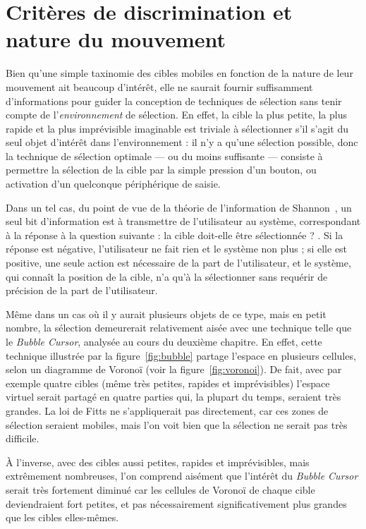 	\section{Critères de discrimination et nature du mouvement}
	Bien qu'une \og simple \fg{} taxinomie des cibles mobiles en fonction de la nature de leur mouvement ait beaucoup d'intérêt, elle ne saurait fournir suffisamment d'informations pour guider la conception de techniques de sélection sans tenir compte de l'\emph{environnement} de sélection. En effet, la cible la plus petite, la plus rapide et la plus imprévisible imaginable est triviale à sélectionner s'il s'agit du seul objet d'intérêt dans l'environnement : il n'y a qu'une sélection possible, donc la technique de sélection optimale --- ou du moins suffisante --- consiste à permettre la sélection de la cible par la simple pression d'un bouton, ou activation d'un quelconque périphérique de saisie.
	
	Dans un tel cas, du point de vue de la théorie de l'information de Shannon~\cite{shannon2001mathematical}, un seul bit d'information est à transmettre de l'utilisateur au système, correspondant à la réponse à la question suivante : \og la cible doit-elle être sélectionnée ? \fg{}. Si la réponse est négative, l'utilisateur ne fait rien et le système non plus ; si elle est positive, une seule action est nécessaire de la part de l'utilisateur, et le système, qui connaît la position de la cible, n'a qu'à la sélectionner sans requérir de précision de la part de l'utilisateur.
	
	Même dans un cas où il y aurait plusieurs objets de ce type, mais en petit nombre, la sélection demeurerait relativement aisée avec une technique telle que le \emph{Bubble Cursor}, analysée au cours du deuxième chapitre. En effet, cette technique illustrée par la figure~\ref{fig:bubble} partage l'espace en plusieurs cellules, selon un diagramme de Voronoï (voir la figure~\ref{fig:voronoi}). De fait, avec par exemple quatre cibles (même très petites, rapides et imprévisibles) l'espace virtuel serait partagé en quatre parties qui, la plupart du temps, seraient très grandes. La loi de Fitts ne s'appliquerait pas directement, car ces zones de sélection seraient mobiles, mais l'on voit bien que la sélection ne serait pas très difficile.
	
	À l'inverse, avec des cibles aussi petites, rapides et imprévisibles, mais extrêmement nombreuses, l'on comprend aisément que l'intérêt du \emph{Bubble Cursor} serait très fortement diminué car les cellules de Voronoï de chaque cible deviendraient fort petites, et pas nécessairement significativement plus grandes que les cibles elles-mêmes.
	
